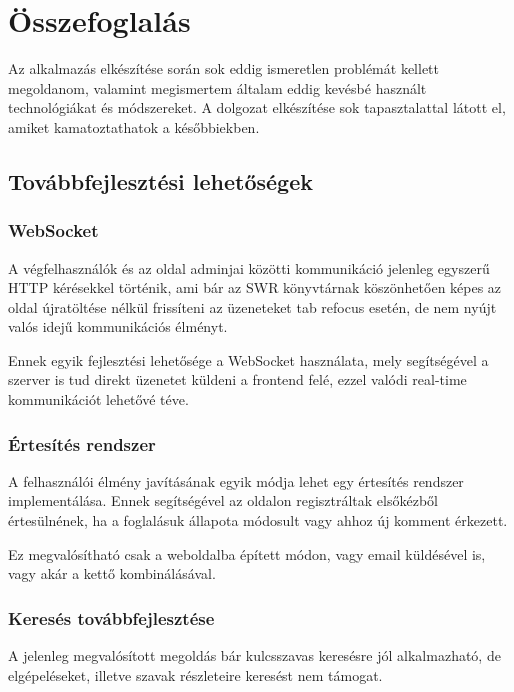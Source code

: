 \chapter{Összefoglalás}

Az alkalmazás elkészítése során sok eddig ismeretlen problémát kellett megoldanom, valamint megismertem
általam eddig kevésbé használt technológiákat és módszereket. A dolgozat elkészítése sok tapasztalattal látott
el, amiket kamatoztathatok a későbbiekben.

\section{Továbbfejlesztési lehetőségek}

\subsection{WebSocket}

A végfelhasználók és az oldal adminjai közötti kommunikáció jelenleg egyszerű HTTP kérésekkel történik,
ami bár az SWR könyvtárnak köszönhetően képes az oldal újratöltése nélkül frissíteni az üzeneteket tab refocus esetén,
de nem nyújt valós idejű kommunikációs élményt.

Ennek egyik fejlesztési lehetősége a WebSocket használata, mely segítségével a szerver is tud direkt
üzenetet küldeni a frontend felé, ezzel valódi real-time kommunikációt lehetővé téve.

\subsection{Értesítés rendszer}

A felhasználói élmény javításának egyik módja lehet egy értesítés rendszer implementálása. Ennek segítségével
az oldalon regisztráltak elsőkézből értesülnének, ha a foglalásuk állapota módosult vagy ahhoz új komment érkezett.

Ez megvalósítható csak a weboldalba épített módon, vagy email küldésével is, vagy akár a kettő kombinálásával.

\subsection{Keresés továbbfejlesztése}

A jelenleg megvalósított megoldás bár kulcsszavas keresésre jól alkalmazható, de elgépeléseket, illetve
szavak részleteire keresést nem támogat.

